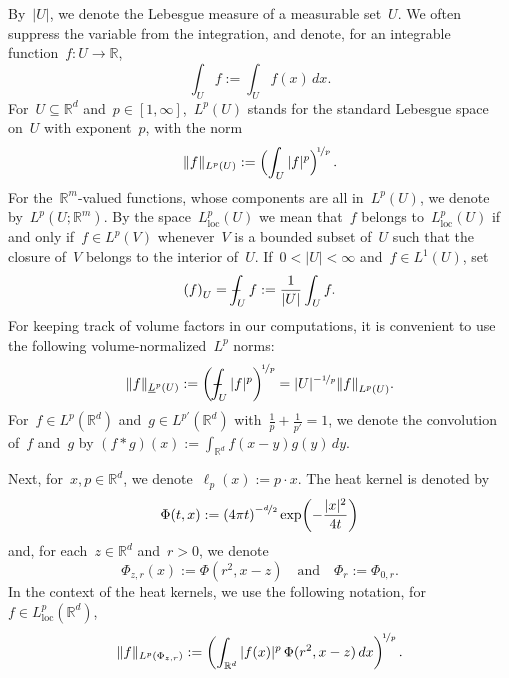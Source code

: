 \documentclass[11pt,twoside]{article} %
\numberwithin{equation}{section}
\theoremstyle{definition}
\let\originalleft\left
\let\originalright\right
\renewcommand{\left}{\mathopen{}\mathclose\bgroup\originalleft}
\renewcommand{\right}{\aftergroup\egroup\originalright}
\newcommand*{\R}{\ensuremath{\mathbb{R}}}
\newcommand*{\Rd}{\ensuremath{\mathbb{R}^d}}
\def\Xint#1{\mathchoice
{\XXint\displaystyle\textstyle{#1}}%
{\XXint\textstyle\scriptstyle{#1}}%
{\XXint\scriptstyle\scriptscriptstyle{#1}}%
{\XXint\scriptscriptstyle\scriptscriptstyle{#1}}%
\!\int}
\def\XXint#1#2#3{{\setbox0=\hbox{$#1{#2#3}{\int}$}
\vcenter{\hbox{$#2#3$}}\kern-.5\wd0}}
\def\fint{\Xint-}
\begin{document}
By~$|U|$, we denote the Lebesgue measure of a measurable set~$U$. We often suppress the variable from the integration, and denote, for an integrable function~$f: U \to \R$,
\begin{equation*} \label{}
\int_U f:=  \int_U f(x)\,dx. 
\end{equation*}
For~$U\subseteq \Rd$ and~$p\in[1,\infty]$,~$L^p(U)$ stands for the standard Lebesgue space on~$U$ with exponent~$p$, with the norm
\begin{equation*}  
\| f \|_{L^p(U)} := \Bigl( \int_U | f |^p \Bigr)^{\!\nicefrac1p} \,.
\end{equation*}
For the~$\R^m$-valued functions, whose components are all in~$L^p(U)$, we denote by~$L^p(U;\R^m)$. 
By the space~$L_{\mathrm{loc}}^p(U)$ we mean that~$f$ belongs to~$L_{\mathrm{loc}}^p(U)$ if and only if~$f \in L^p(V)$ whenever~$V$ is a bounded subset of~$U$ such that the closure of~$V$ belongs to the interior of~$U$. If~$0< |U| < \infty$ and~$f \in L^1(U)$, set
\begin{equation*}  %
\left( f \right)_U = \fint_U f := \frac 1 {|U|} \int_U f.
\end{equation*}
For keeping track of volume factors in our computations, it is convenient to use the following volume-normalized~$L^p$ norms:
\begin{equation} 
\label{e.volume.normalized}
\|f\|_{\underline{L}^p(U)} := \biggl( \fint_U |f|^p \biggr) ^{\!\nicefrac 1 p} = | U |^{-\nicefrac 1p} \left\| f \right\|_{L^p(U)}.
\end{equation}
For~$f\in L^p(\Rd)$ and~$g\in L^{p'}(\Rd)$ with~$\frac1p+\frac1{p'}=1$, we denote the convolution of~$f$ and~$g$ by
$
( f\ast g )(x) := \int_{\Rd} f(x-y)g(y)\,dy.
$



\smallskip

Next, for~$x,p\in\Rd$, we denote~$\ell_p(x):= p\cdot x$.  The heat kernel is denoted by
\begin{equation*} \label{}
\Phi(t,x):= \left( 4\pi t\right)^{-\nicefrac d2} \exp\left( -\frac{|x|^2}{4t} \right)
\end{equation*}
and, for each~$z\in\Rd$ and~$r>0$, we denote
\begin{equation*} \label{}
\Phi_{z,r} (x):= \Phi(r^2, x-z) \quad \mbox{and} \quad \Phi_r := \Phi_{0,r}. 
\end{equation*}
In the context of the heat kernels, we use the following notation, for~$f \in L_{\mathrm{loc}}^p(\R^d)$, 
\begin{equation} 
\label{e.L2.Psi}
\| f  \|_{L^p(\Phi_{z,r})} 
:=
\biggl( \int_{\R^d} |f(x)|^p \, \Phi( r^2, x-z ) \, dx \biggr)^{\!\nicefrac1p}
\,.
\end{equation}
\end{document}
